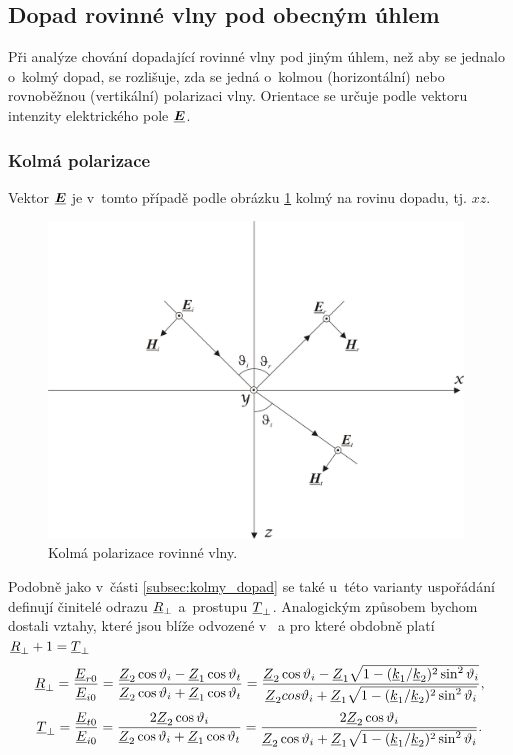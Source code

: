 \subsection{Dopad rovinné vlny pod obecným úhlem}
Při analýze chování dopadající rovinné vlny pod jiným úhlem, než aby se jednalo o~kolmý dopad, se rozlišuje, zda se jedná o~kolmou (horizontální) nebo rovnoběžnou (vertikální) polarizaci vlny. Orientace se určuje podle vektoru intenzity elektrického pole $\mbox{\underline{\boldmath$E$}}$.
\subsubsection*{Kolmá polarizace}
Vektor $\mbox{\underline{\boldmath$E$}}$ je v~tomto případě podle obrázku \ref{obr:evlny_kolma_polarizace} kolmý na rovinu dopadu, tj. $xz$.
\begin{figure}[!h]
	\centering
	\includegraphics[width=11cm]{evlny_kolma_polarizace.png}
	\caption{Kolmá polarizace rovinné vlny. \cite{emp}}
	\label{obr:evlny_kolma_polarizace}
\end{figure}
Podobně jako v~části \ref{subsec:kolmy_dopad} se také u~této varianty uspořádání definují činitelé odrazu ${\underline{R}}_{\perp}$ a~prostupu ${\underline{T}}_{\perp}$. Analogickým způsobem bychom dostali vztahy, které jsou blíže odvozené v~\cite[str. 94]{emp} a pro které obdobně platí ${\underline{R}}_{\perp} + 1 = {\underline{T}}_{\perp}$
\begin{equation}
	{\underline{R}}_{\perp} = \frac{{\underline{E}}_{r0}}{{\underline{E}}_{i0}} = \frac{{\underline{Z}}_{2}\cos\vartheta_{i}-{\underline{Z}}_{1}\cos\vartheta_{t}}{{\underline{Z}}_{2}\cos\vartheta_{i}+{\underline{Z}}_{1}\cos\vartheta_{t}} = \frac{{\underline{Z}}_{2}\cos\vartheta_{i}-{\underline{Z}}_{1}\sqrt{1-({\underline{k}}_{1}/{\underline{k}}_{2})^{2}\sin^{2}\vartheta_{i}}}{{\underline{Z}}_{2}cos\vartheta_{i}+{\underline{Z}}_{1}\sqrt{1-({\underline{k}}_{1}/{\underline{k}}_{2})^{2}\sin^{2}\vartheta_{i}}},
	\label{rce:evlny_cin_odrazu_kolma}
\end{equation}
\begin{equation}
	{\underline{T}}_{\perp} = \frac{{\underline{E}}_{t0}}{{\underline{E}}_{i0}} = \frac{2{\underline{Z}}_{2}\cos\vartheta_{i}}{{\underline{Z}}_{2}\cos\vartheta_{i}+{\underline{Z}}_{1}\cos\vartheta_{t}} = \frac{2{\underline{Z}}_{2}\cos\vartheta_{i}}{{\underline{Z}}_{2}\cos\vartheta_{i}+{\underline{Z}}_{1}\sqrt{1-({\underline{k}}_{1}/{\underline{k}}_{2})^{2}\sin^{2}\vartheta_{i}}}.
	\label{rce:evlny_cin_prostupu_kolma}
\end{equation}

